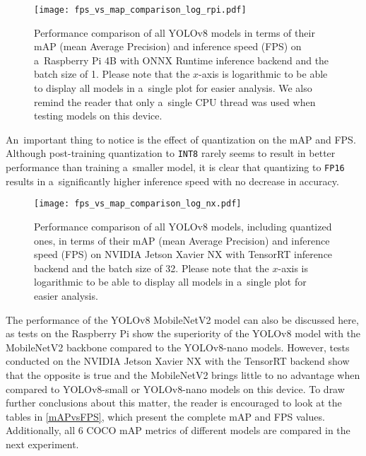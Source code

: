 \begin{figure}[t]
        \centering
        \texttt{[image: fps\_vs\_map\_comparison\_log\_rpi.pdf]}
        \caption{Performance comparison of all YOLOv8 models in terms of their
        mAP (mean Average Precision) and inference speed (FPS) on a~Raspberry Pi
        4B with ONNX Runtime inference backend and the batch size of 1. Please
        note that the $x$-axis is logarithmic to be able to display all models
        in a~single plot for easier analysis. We also remind the reader that
        only a~single CPU thread was used when testing models on this device.}
        \label{FPSvsmAPComparisonRPi}
\end{figure}

An~important thing to notice is the effect of quantization on the mAP and FPS.
Although post-training quantization to \texttt{INT8} rarely seems to result in
better performance than training a~smaller model, it is clear that quantizing to
\texttt{FP16} results in a~significantly higher inference speed with no decrease
in accuracy.

\begin{figure}[H]
        \centering
        \texttt{[image: fps\_vs\_map\_comparison\_log\_nx.pdf]}
        \caption{Performance comparison of all YOLOv8 models, including
        quantized ones, in terms of their mAP (mean Average Precision) and
        inference speed (FPS) on NVIDIA Jetson Xavier NX with TensorRT inference
        backend and the batch size of 32. Please note that the $x$-axis is
        logarithmic to be able to display all models in a~single plot for easier
        analysis.}
        \label{FPSvsmAPComparisonNX}
\end{figure}

The performance of the YOLOv8 MobileNetV2 model can also be discussed here, as
tests on the Raspberry Pi show the superiority of the YOLOv8 model with the
MobileNetV2 backbone compared to the YOLOv8-nano models. However, tests
conducted on the NVIDIA Jetson Xavier NX with the TensorRT backend show that the
opposite is true and the MobileNetV2 brings little to no advantage when compared
to YOLOv8-small or YOLOv8-nano models on this device. To draw further
conclusions about this matter, the reader is encouraged to look at the tables in
\autoref{mAPvsFPS}, which present the complete mAP and FPS values. Additionally,
all 6 COCO mAP metrics of different models are compared in the next experiment.

